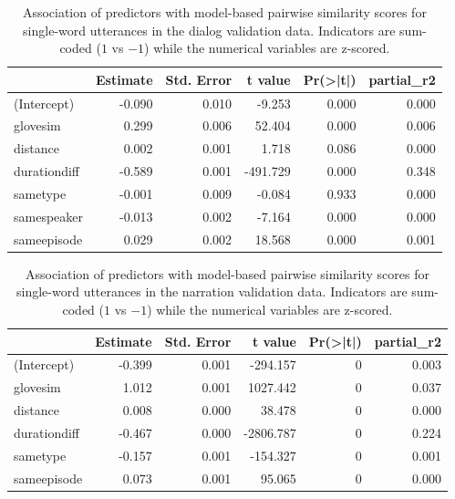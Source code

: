 \begin{table}
  \centering

\begin{tabular}{lrrrrr}
\toprule
  & Estimate & Std. Error & t value & Pr(>|t|) & partial\_r2\\
\midrule
(Intercept) & -0.090 & 0.010 & -9.253 & 0.000 & 0.000\\
glovesim & 0.299 & 0.006 & 52.404 & 0.000 & 0.006\\
distance & 0.002 & 0.001 & 1.718 & 0.086 & 0.000\\
durationdiff & -0.589 & 0.001 & -491.729 & 0.000 & 0.348\\
sametype & -0.001 & 0.009 & -0.084 & 0.933 & 0.000\\
\addlinespace
samespeaker & -0.013 & 0.002 & -7.164 & 0.000 & 0.000\\
sameepisode & 0.029 & 0.002 & 18.568 & 0.000 & 0.001\\
  \bottomrule
\end{tabular}
\caption{Association of predictors with model-based pairwise
  similarity scores for single-word utterances in the dialog
  validation data. Indicators are sum-coded ($1$ vs $-1$) while the
  numerical variables are z-scored.}
\label{tab:dialog-lm}
\end{table}



\begin{table}
  \centering
\begin{tabular}{lrrrrr}
\toprule
  & Estimate & Std. Error & t value & Pr(>|t|) & partial\_r2\\
\midrule
(Intercept) & -0.399 & 0.001 & -294.157 & 0 & 0.003\\
glovesim & 1.012 & 0.001 & 1027.442 & 0 & 0.037\\
distance & 0.008 & 0.000 & 38.478 & 0 & 0.000\\
durationdiff & -0.467 & 0.000 & -2806.787 & 0 & 0.224\\
sametype & -0.157 & 0.001 & -154.327 & 0 & 0.001\\
\addlinespace
sameepisode & 0.073 & 0.001 & 95.065 & 0 & 0.000\\
\bottomrule
\end{tabular}
\caption{Association of predictors with model-based pairwise
  similarity scores for single-word utterances in the narration
  validation data. Indicators are sum-coded ($1$ vs $-1$) while the
  numerical variables are z-scored.}
\label{tab:narration-lm}
\end{table}

